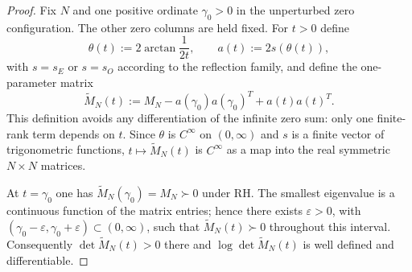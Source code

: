 \documentclass[preprint,12pt]{elsarticle}
\numberwithin{equation}{section}
\theoremstyle{plain}
\theoremstyle{definition}
\theoremstyle{remark}
\newcommand{\RH}{\mathrm{RH}}
\begin{document}
\begin{proof}
Fix $N$ and one positive ordinate $\gamma_0>0$ in the unperturbed zero configuration.  The other zero columns are held fixed.  For $t>0$ define
\begin{equation}
\theta(t):=2\arctan\frac{1}{2t},
\qquad
a(t):=2s(\theta(t)),
\end{equation}
with $s=s_E$ or $s=s_O$ according to the reflection family, and define the one-parameter matrix
\begin{equation}
\widetilde M_N(t):=M_N-a(\gamma_0)a(\gamma_0)^T+a(t)a(t)^T.
\label{eq:local_moving_zero_matrix}
\end{equation}
This definition avoids any differentiation of the infinite zero sum: only one finite-rank term depends on $t$.  Since $\theta$ is $C^\infty$ on $(0,\infty)$ and $s$ is a finite vector of trigonometric functions, $t\mapsto\widetilde M_N(t)$ is $C^\infty$ as a map into the real symmetric $N\times N$ matrices.

At $t=\gamma_0$ one has $\widetilde M_N(\gamma_0)=M_N\succ0$ under $\RH$.  The smallest eigenvalue is a continuous function of the matrix entries; hence there exists $\varepsilon>0$, with $(\gamma_0-\varepsilon,\gamma_0+\varepsilon)\subset(0,\infty)$, such that $\widetilde M_N(t)\succ0$ throughout this interval.  Consequently $\det\widetilde M_N(t)>0$ there and $\log\det\widetilde M_N(t)$ is well defined and differentiable.


\end{proof}
\end{document}
